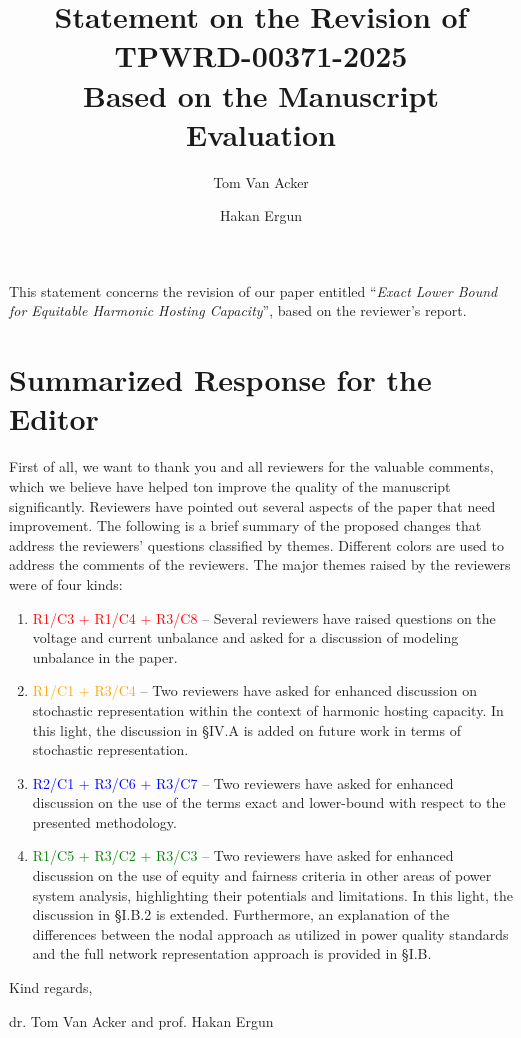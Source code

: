 \documentclass[10pt]{article}
\title{Statement on the Revision of TPWRD-00371-2025\\ Based on the Manuscript Evaluation} \author{Tom Van Acker \and Hakan Ergun}
\date{}
\begin{document}
This statement concerns the revision of our paper entitled ``\textit{Exact Lower Bound for Equitable Harmonic Hosting Capacity}'', based on the reviewer's report.

\section*{Summarized Response for the Editor}
First of all, we want to thank you and all reviewers for the valuable comments, which we believe have helped ton improve the quality of the manuscript significantly. Reviewers have pointed out several aspects of the paper that need improvement. The following is a brief summary of the proposed changes that address the reviewers' questions classified by themes. Different colors are used to address the comments of the reviewers. The major themes raised by the reviewers were of four kinds:
\begin{enumerate}
    \item \textcolor{red}{R1/C3 + R1/C4 + R3/C8} -- Several reviewers have raised questions on the voltage and current unbalance and asked for a discussion of modeling unbalance in the paper. 
    \item \textcolor{orange}{R1/C1 + R3/C4} -- Two reviewers have asked for enhanced discussion on stochastic representation within the context of harmonic hosting capacity. In this light, the discussion in \S IV.A is added on future work in terms of stochastic representation. 
    \item \textcolor{blue}{R2/C1 + R3/C6 + R3/C7} -- Two reviewers have asked for enhanced discussion on the use of the terms exact and lower-bound with respect to the presented methodology. 
    \item \textcolor{green}{R1/C5 + R3/C2 + R3/C3} -- Two reviewers have asked for enhanced discussion on the use of equity and fairness criteria in other areas of power system analysis, highlighting their potentials and limitations. In this light, the discussion in \S I.B.2 is extended. Furthermore, an explanation of the differences between the nodal approach as utilized in power quality standards and the full network representation approach is  provided in \S I.B.
\end{enumerate}

\noindent
Kind regards,\newline

\noindent
dr. Tom Van Acker and prof. Hakan Ergun

\newpage
\end{document}
